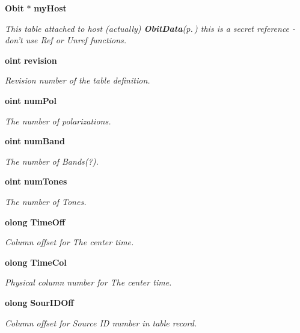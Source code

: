 \begin{CompactItemize}
{\bf Obit} $\ast$ {\bf my\-Host}
\begin{CompactList}\small\item\em This table attached to host (actually) {\bf Obit\-Data}{\rm (p.\,\pageref{structObitData})} this is a secret reference - don't use Ref or Unref functions. \item\end{CompactList}\item 
{\bf oint} {\bf revision}
\begin{CompactList}\small\item\em Revision number of the table definition. \item\end{CompactList}\item 
{\bf oint} {\bf num\-Pol}
\begin{CompactList}\small\item\em The number of polarizations. \item\end{CompactList}\item 
{\bf oint} {\bf num\-Band}
\begin{CompactList}\small\item\em The number of Bands(?). \item\end{CompactList}\item 
{\bf oint} {\bf num\-Tones}
\begin{CompactList}\small\item\em The number of Tones. \item\end{CompactList}\item 
{\bf olong} {\bf Time\-Off}
\begin{CompactList}\small\item\em Column offset for The center time. \item\end{CompactList}\item 
{\bf olong} {\bf Time\-Col}
\begin{CompactList}\small\item\em Physical column number for The center time. \item\end{CompactList}\item 
{\bf olong} {\bf Sour\-IDOff}
\begin{CompactList}\small\item\em Column offset for Source ID number in table record. \item\end{CompactList}\item 

\end{CompactItemize}
